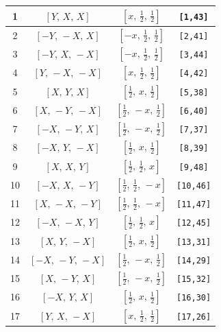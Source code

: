 \documentclass[fleqn,8pt]{jsarticle}
\begin{document}
\begin{longtable}{cccc}
1 & $\left[ Y,\, X,\, X \right]$ & $\left[ x,\, \frac{1}{2},\, \frac{1}{2} \right]$ & {\tt [1,43]} \\ \hline
2 & $\left[ - Y,\, - X,\, X \right]$ & $\left[ - x,\, \frac{1}{2},\, \frac{1}{2} \right]$ & {\tt [2,41]} \\ \hline
3 & $\left[ - Y,\, X,\, - X \right]$ & $\left[ - x,\, \frac{1}{2},\, \frac{1}{2} \right]$ & {\tt [3,44]} \\ \hline
4 & $\left[ Y,\, - X,\, - X \right]$ & $\left[ x,\, \frac{1}{2},\, \frac{1}{2} \right]$ & {\tt [4,42]} \\ \hline
5 & $\left[ X,\, Y,\, X \right]$ & $\left[ \frac{1}{2},\, x,\, \frac{1}{2} \right]$ & {\tt [5,38]} \\ \hline
6 & $\left[ X,\, - Y,\, - X \right]$ & $\left[ \frac{1}{2},\, - x,\, \frac{1}{2} \right]$ & {\tt [6,40]} \\ \hline
7 & $\left[ - X,\, - Y,\, X \right]$ & $\left[ \frac{1}{2},\, - x,\, \frac{1}{2} \right]$ & {\tt [7,37]} \\ \hline
8 & $\left[ - X,\, Y,\, - X \right]$ & $\left[ \frac{1}{2},\, x,\, \frac{1}{2} \right]$ & {\tt [8,39]} \\ \hline
9 & $\left[ X,\, X,\, Y \right]$ & $\left[ \frac{1}{2},\, \frac{1}{2},\, x \right]$ & {\tt [9,48]} \\ \hline
10 & $\left[ - X,\, X,\, - Y \right]$ & $\left[ \frac{1}{2},\, \frac{1}{2},\, - x \right]$ & {\tt [10,46]} \\ \hline
11 & $\left[ X,\, - X,\, - Y \right]$ & $\left[ \frac{1}{2},\, \frac{1}{2},\, - x \right]$ & {\tt [11,47]} \\ \hline
12 & $\left[ - X,\, - X,\, Y \right]$ & $\left[ \frac{1}{2},\, \frac{1}{2},\, x \right]$ & {\tt [12,45]} \\ \hline
13 & $\left[ X,\, Y,\, - X \right]$ & $\left[ \frac{1}{2},\, x,\, \frac{1}{2} \right]$ & {\tt [13,31]} \\ \hline
14 & $\left[ - X,\, - Y,\, - X \right]$ & $\left[ \frac{1}{2},\, - x,\, \frac{1}{2} \right]$ & {\tt [14,29]} \\ \hline
15 & $\left[ X,\, - Y,\, X \right]$ & $\left[ \frac{1}{2},\, - x,\, \frac{1}{2} \right]$ & {\tt [15,32]} \\ \hline
16 & $\left[ - X,\, Y,\, X \right]$ & $\left[ \frac{1}{2},\, x,\, \frac{1}{2} \right]$ & {\tt [16,30]} \\ \hline
17 & $\left[ Y,\, X,\, - X \right]$ & $\left[ x,\, \frac{1}{2},\, \frac{1}{2} \right]$ & {\tt [17,26]} \\ \hline

\end{longtable}
\end{document}
